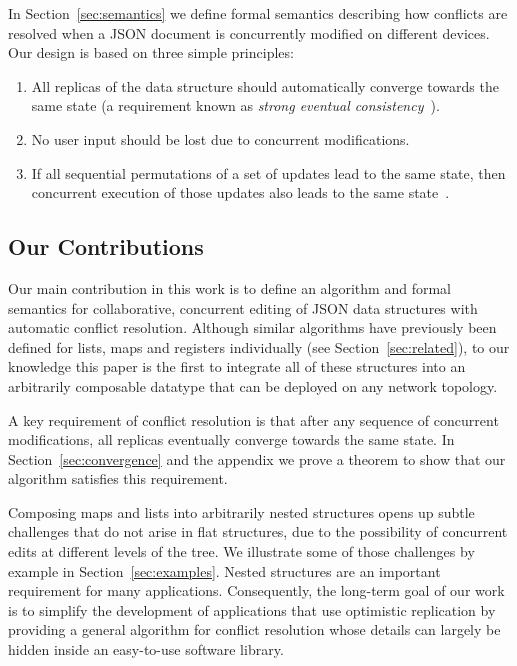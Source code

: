 \documentclass[10pt,journal,compsoc]{IEEEtran}
\begin{document}
In Section~\ref{sec:semantics} we define formal semantics describing how conflicts are resolved when a JSON document is concurrently modified on different devices. Our design is based on three simple principles:
\begin{enumerate}
\item All replicas of the data structure should automatically converge towards the same state (a requirement known as \emph{strong eventual consistency}~\cite{Shapiro:2011un}).
\item No user input should be lost due to concurrent modifications.
\item If all sequential permutations of a set of updates lead to the same state, then concurrent execution of those updates also leads to the same state~\cite{Bieniusa:2012gt}.
\end{enumerate}

\subsection{Our Contributions}

Our main contribution in this work is to define an algorithm and formal semantics for collaborative, concurrent editing of JSON data structures with automatic conflict resolution. Although similar algorithms have previously been defined for lists, maps and registers individually (see Section~\ref{sec:related}), to our knowledge this paper is the first to integrate all of these structures into an arbitrarily composable datatype that can be deployed on any network topology.

A key requirement of conflict resolution is that after any sequence of concurrent modifications, all replicas eventually converge towards the same state. In Section~\ref{sec:convergence} and the appendix we prove a theorem to show that our algorithm satisfies this requirement.

Composing maps and lists into arbitrarily nested structures opens up subtle challenges that do not arise in flat structures, due to the possibility of concurrent edits at different levels of the tree. We illustrate some of those challenges by example in Section~\ref{sec:examples}. Nested structures are an important requirement for many applications. Consequently, the long-term goal of our work is to simplify the development of applications that use optimistic replication by providing a general algorithm for conflict resolution whose details can largely be hidden inside an easy-to-use software library.
\end{document}
